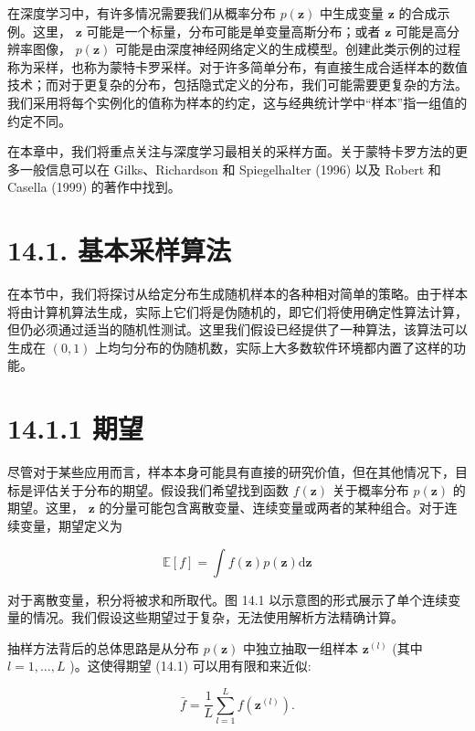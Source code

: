 \documentclass[10pt]{article}
\begin{document}
在深度学习中，有许多情况需要我们从概率分布 \(p\left( \mathbf{z}\right)\) 中生成变量 \(\mathbf{z}\) 的合成示例。这里， \(\mathbf{z}\) 可能是一个标量，分布可能是单变量高斯分布；或者 \(\mathbf{z}\) 可能是高分辨率图像， \(p\left( \mathbf{z}\right)\) 可能是由深度神经网络定义的生成模型。创建此类示例的过程称为采样，也称为蒙特卡罗采样。对于许多简单分布，有直接生成合适样本的数值技术；而对于更复杂的分布，包括隐式定义的分布，我们可能需要更复杂的方法。我们采用将每个实例化的值称为样本的约定，这与经典统计学中“样本”指一组值的约定不同。

在本章中，我们将重点关注与深度学习最相关的采样方面。关于蒙特卡罗方法的更多一般信息可以在 Gilks、Richardson 和 Spiegelhalter (1996) 以及 Robert 和 Casella (1999) 的著作中找到。

\section*{14.1. 基本采样算法}

在本节中，我们将探讨从给定分布生成随机样本的各种相对简单的策略。由于样本将由计算机算法生成，实际上它们将是伪随机的，即它们将使用确定性算法计算，但仍必须通过适当的随机性测试。这里我们假设已经提供了一种算法，该算法可以生成在 \(\left( {0,1}\right)\) 上均匀分布的伪随机数，实际上大多数软件环境都内置了这样的功能。

\section*{14.1.1 期望}

尽管对于某些应用而言，样本本身可能具有直接的研究价值，但在其他情况下，目标是评估关于分布的期望。假设我们希望找到函数 \(f\left( \mathbf{z}\right)\) 关于概率分布 \(p\left( \mathbf{z}\right)\) 的期望。这里， \(\mathbf{z}\) 的分量可能包含离散变量、连续变量或两者的某种组合。对于连续变量，期望定义为

\[
\mathbb{E}\left\lbrack  f\right\rbrack   = \int f\left( \mathbf{z}\right) p\left( \mathbf{z}\right) \mathrm{d}\mathbf{z} \tag{14.1}
\]

对于离散变量，积分将被求和所取代。图 14.1 以示意图的形式展示了单个连续变量的情况。我们假设这些期望过于复杂，无法使用解析方法精确计算。

抽样方法背后的总体思路是从分布 \(p\left( \mathbf{z}\right)\) 中独立抽取一组样本 \({\mathbf{z}}^{\left( l\right) }\) (其中 \(l = 1,\ldots ,L\) )。这使得期望 (14.1) 可以用有限和来近似:

\[
\bar{f} = \frac{1}{L}\mathop{\sum }\limits_{{l = 1}}^{L}f\left( {\mathbf{z}}^{\left( l\right) }\right) . \tag{14.2}
\]
\end{document}
